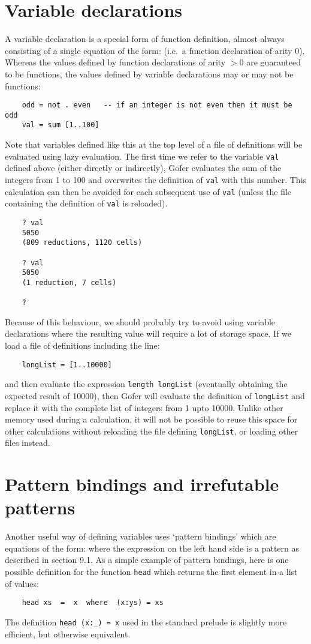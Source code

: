 \section{Variable declarations}
A variable declaration  is  a  special  form  of  function  definition,
almost always consisting of a single equation of the form:
\BQ
      \TT{=} 
\EQ
(i.e.\ a function declaration of arity 0).  Whereas the  values  defined
by function declarations of arity $>0$ are guaranteed to be functions, the
values defined by variable declarations may or may not be functions:
\begin{verbatim}
    odd = not . even   -- if an integer is not even then it must be odd
    val = sum [1..100]
\end{verbatim}
Note that variables defined like this at the top level  of  a  file  of
definitions will be evaluated using lazy evaluation.  The first time we
refer  to  the  variable  \verb"val"  defined  above  (either  directly   or
indirectly), Gofer evaluates the sum of the integers from 1 to 100  and
overwrites the definition of \verb"val" with this number.  This  calculation
can then be avoided for each subsequent use of \verb"val" (unless  the  file
containing the definition of \verb"val" is reloaded).
\begin{verbatim}
    ? val
    5050
    (809 reductions, 1120 cells)

    ? val
    5050
    (1 reduction, 7 cells)

    ?
\end{verbatim}
Because of this behaviour, we should probably try to avoid using  variable
declarations where the resulting value will require a  lot  of  storage
space.  If we load a file of definitions including the line:
\begin{verbatim}
    longList = [1..10000]
\end{verbatim}
and  then  evaluate  the  expression  \verb"length longList"   (eventually
obtaining the expected result of 10000), then Gofer will  evaluate  the
definition of \verb"longList" and replace  it  with  the  complete  list  of
integers from  1  upto  10000.   Unlike  other  memory  used  during  a
calculation, it will not be possible to  reuse  this  space  for  other
calculations without reloading the file defining \verb"longList", or loading
other files instead.


\section{Pattern bindings and irrefutable patterns}
Another useful way of defining variables uses `pattern bindings'  which
are equations of the form:
\BQ
       \TT{=} 
\EQ
where the expression on the left hand side is a pattern as described in
section 9.1.  As a simple example of  pattern  bindings,  here  is  one
possible definition for the function \verb"head"  which  returns  the  first
element in a list of values:
\begin{verbatim}
    head xs  =  x  where  (x:ys) = xs
\end{verbatim}
The definition \verb"head (x:_) = x"  used  in  the  standard  prelude  is
slightly more efficient, but otherwise equivalent.

